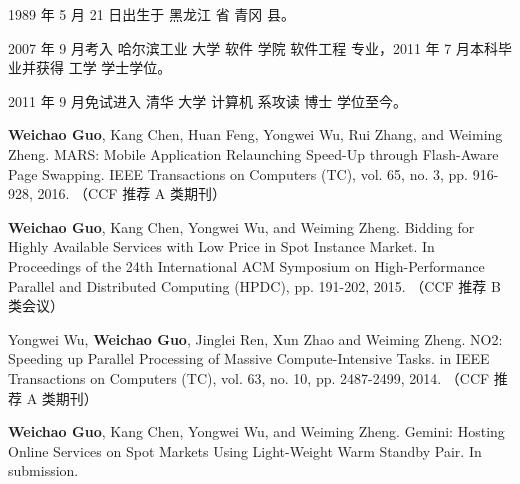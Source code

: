\begin{resume}


  1989 年 5 月 21 日出生于 黑龙江 省 青冈 县。

  2007 年 9 月考入 哈尔滨工业 大学 软件 学院 软件工程 专业，2011 年 7 月本科毕业并获得 工学 学士学位。

  2011 年 9 月免试进入 清华 大学 计算机 系攻读 博士 学位至今。


  \begin{publications}
    \item \textbf{Weichao Guo}, Kang Chen, Huan Feng, Yongwei Wu, Rui Zhang, and 
    Weiming Zheng. MARS: Mobile Application Relaunching Speed-Up through 
    Flash-Aware Page Swapping. IEEE Transactions on Computers (TC), vol. 
    65, no. 3, pp. 916-928, 2016. （CCF 推荐 A 类期刊）
    \item \textbf{Weichao Guo}, Kang Chen, Yongwei Wu, and Weiming Zheng. Bidding 
    for Highly Available Services with Low Price in Spot Instance Market.
     In Proceedings of the 24th International ACM Symposium on High-Performance 
     Parallel and Distributed Computing (HPDC), pp. 191-202, 2015. （CCF 推荐 B 类会议）
    \item Yongwei Wu, \textbf{Weichao Guo}, Jinglei Ren, Xun Zhao and Weiming Zheng. 
    NO2: Speeding up Parallel Processing of Massive Compute-Intensive Tasks.
     in IEEE Transactions on Computers (TC), vol. 63, no. 10, pp. 2487-2499, 
     2014. （CCF 推荐 A 类期刊）
  \end{publications}

  \begin{publications}[before=\publicationskip,after=\publicationskip]
    \item \textbf{Weichao Guo}, Kang Chen, Yongwei Wu, and Weiming Zheng. Gemini: 
    Hosting Online Services on Spot Markets Using Light-Weight Warm Standby Pair.
    In submission.
  \end{publications}



\end{resume}
